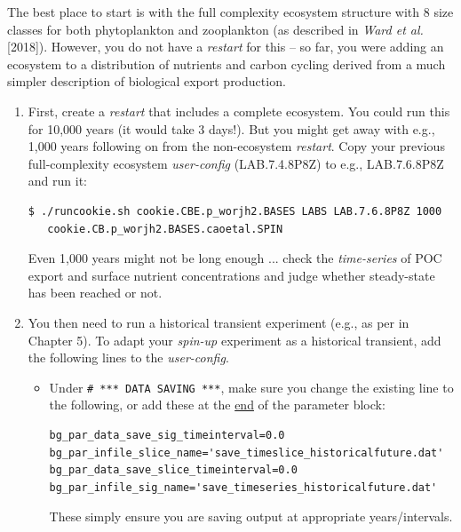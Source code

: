 \vspace{1mm}
The best place to start is with the full complexity ecosystem structure with 8 size classes for both phytoplankton and zooplankton (as described in \textit{Ward et al.} [2018]). However, you do not have a \textit{restart} for this -- so far, you were adding an ecosystem to a distribution of nutrients and carbon cycling derived from a much simpler description of biological export production.

\begin{enumerate}[noitemsep]

\vspace{2mm}
\item First, create a \textit{restart} that includes a complete ecosystem. You could run this for 10,000 years (it would take 3 days!). But you might get away with e.g., 1,000 years following on from the non-ecosystem \textit{restart}. Copy your previous full-complexity ecosystem \textit{user-config} (\textsf{\footnotesize LAB.7.4.8P8Z}) to e.g., \textsf{\footnotesize LAB.7.6.8P8Z} and run it:

\vspace{-1mm}\small\begin{verbatim}
$ ./runcookie.sh cookie.CBE.p_worjh2.BASES LABS LAB.7.6.8P8Z 1000
   cookie.CB.p_worjh2.BASES.caoetal.SPIN
\end{verbatim}\normalsize\vspace{-1mm}

Even 1,000 years might not be long enough ... check the \textit{time-series} of POC export and surface nutrient concentrations and judge whether steady-state has been reached or not.

\vspace{2mm}
\item You then need to run a historical transient experiment (e.g., as per in Chapter 5). To adapt your \textit{spin-up} experiment as a historical transient, add the following lines to the \textit{user-config}.

\vspace{1mm}
\begin{itemize}[noitemsep]

\vspace{1mm}
\item Under \texttt{\small \# *** DATA SAVING ***}, make sure you change the existing line to the following, or add these at the \uline{end} of the parameter block:
\vspace{-1mm}\small\begin{verbatim}
bg_par_data_save_sig_timeinterval=0.0
bg_par_infile_slice_name='save_timeslice_historicalfuture.dat'
bg_par_data_save_slice_timeinterval=0.0
bg_par_infile_sig_name='save_timeseries_historicalfuture.dat'
\end{verbatim}\normalsize\vspace{-1mm}
These simply ensure you are saving output at appropriate years/intervals.


\end{itemize}
\end{enumerate}
